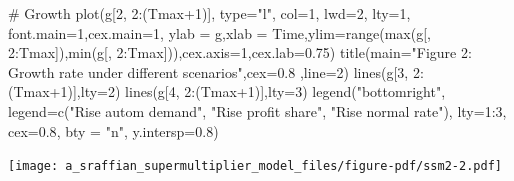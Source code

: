 \documentclass[
  letterpaper,
  DIV=11,
  numbers=noendperiod]{scrreprt}
\newenvironment{Shaded}{\begin{snugshade}}{\end{snugshade}}
\newcommand{\AttributeTok}[1]{\textcolor[rgb]{0.40,0.45,0.13}{#1}}
\newcommand{\CommentTok}[1]{\textcolor[rgb]{0.37,0.37,0.37}{#1}}
\newcommand{\DecValTok}[1]{\textcolor[rgb]{0.68,0.00,0.00}{#1}}
\newcommand{\FloatTok}[1]{\textcolor[rgb]{0.68,0.00,0.00}{#1}}
\newcommand{\FunctionTok}[1]{\textcolor[rgb]{0.28,0.35,0.67}{#1}}
\newcommand{\NormalTok}[1]{\textcolor[rgb]{0.00,0.23,0.31}{#1}}
\newcommand{\SpecialCharTok}[1]{\textcolor[rgb]{0.37,0.37,0.37}{#1}}
\newcommand{\StringTok}[1]{\textcolor[rgb]{0.13,0.47,0.30}{#1}}
\begin{document}
\begin{Shaded}
\begin{Highlighting}[]
\CommentTok{\# Growth}
\FunctionTok{plot}\NormalTok{(g[}\DecValTok{2}\NormalTok{, }\DecValTok{2}\SpecialCharTok{:}\NormalTok{(Tmax}\SpecialCharTok{+}\DecValTok{1}\NormalTok{)], }\AttributeTok{type=}\StringTok{"l"}\NormalTok{, }\AttributeTok{col=}\DecValTok{1}\NormalTok{, }\AttributeTok{lwd=}\DecValTok{2}\NormalTok{, }\AttributeTok{lty=}\DecValTok{1}\NormalTok{, }\AttributeTok{font.main=}\DecValTok{1}\NormalTok{,}\AttributeTok{cex.main=}\DecValTok{1}\NormalTok{, }
     \AttributeTok{ylab =} \StringTok{\textquotesingle{}g\textquotesingle{}}\NormalTok{,}\AttributeTok{xlab =} \StringTok{\textquotesingle{}Time\textquotesingle{}}\NormalTok{,}\AttributeTok{ylim=}\FunctionTok{range}\NormalTok{(}\FunctionTok{max}\NormalTok{(g[, }\DecValTok{2}\SpecialCharTok{:}\NormalTok{Tmax]),}\FunctionTok{min}\NormalTok{(g[, }\DecValTok{2}\SpecialCharTok{:}\NormalTok{Tmax])),}\AttributeTok{cex.axis=}\DecValTok{1}\NormalTok{,}\AttributeTok{cex.lab=}\FloatTok{0.75}\NormalTok{)}
\FunctionTok{title}\NormalTok{(}\AttributeTok{main=}\StringTok{"Figure 2: Growth rate under different scenarios"}\NormalTok{,}\AttributeTok{cex=}\FloatTok{0.8}\NormalTok{ ,}\AttributeTok{line=}\DecValTok{2}\NormalTok{)}
\FunctionTok{lines}\NormalTok{(g[}\DecValTok{3}\NormalTok{, }\DecValTok{2}\SpecialCharTok{:}\NormalTok{(Tmax}\SpecialCharTok{+}\DecValTok{1}\NormalTok{)],}\AttributeTok{lty=}\DecValTok{2}\NormalTok{)}
\FunctionTok{lines}\NormalTok{(g[}\DecValTok{4}\NormalTok{, }\DecValTok{2}\SpecialCharTok{:}\NormalTok{(Tmax}\SpecialCharTok{+}\DecValTok{1}\NormalTok{)],}\AttributeTok{lty=}\DecValTok{3}\NormalTok{)}
\FunctionTok{legend}\NormalTok{(}\StringTok{"bottomright"}\NormalTok{, }\AttributeTok{legend=}\FunctionTok{c}\NormalTok{(}\StringTok{"Rise autom demand"}\NormalTok{, }\StringTok{"Rise profit share"}\NormalTok{, }\StringTok{"Rise normal rate"}\NormalTok{),}
       \AttributeTok{lty=}\DecValTok{1}\SpecialCharTok{:}\DecValTok{3}\NormalTok{, }\AttributeTok{cex=}\FloatTok{0.8}\NormalTok{, }\AttributeTok{bty =} \StringTok{"n"}\NormalTok{, }\AttributeTok{y.intersp=}\FloatTok{0.8}\NormalTok{)}
\end{Highlighting}
\end{Shaded}

\texttt{[image: a\_sraffian\_supermultiplier\_model\_files/figure-pdf/ssm2-2.pdf]}
\end{document}
